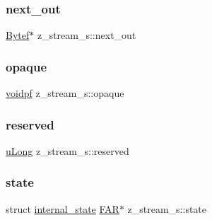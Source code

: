 \subsubsection{\texorpdfstring{next\+\_\+out}{next\_out}}
{\footnotesize\ttfamily \hyperlink{zconf_8h_aeb722a888064be47e12d05f692e0f407}{Bytef}$\ast$ z\+\_\+stream\+\_\+s\+::next\+\_\+out}

\mbox{\label{structz__stream__s_ab72467f908d2ce65d5b42ee6556ef8bb}} 
\subsubsection{\texorpdfstring{opaque}{opaque}}
{\footnotesize\ttfamily \hyperlink{zconf_8h_a04c731495379021454c8e61439dc88ec}{voidpf} z\+\_\+stream\+\_\+s\+::opaque}

\mbox{\label{structz__stream__s_add73791dd19b49c9c68f3f3d328c37db}} 
\subsubsection{\texorpdfstring{reserved}{reserved}}
{\footnotesize\ttfamily \hyperlink{zconf_8h_acd2a5701a3aecf6700d2c66c606ecb40}{u\+Long} z\+\_\+stream\+\_\+s\+::reserved}

\mbox{\label{structz__stream__s_ac4a114217a1868dc6fbe7d1f5bda126b}} 
\subsubsection{\texorpdfstring{state}{state}}
{\footnotesize\ttfamily struct \hyperlink{structinternal__state}{internal\+\_\+state} \hyperlink{zconf_8h_aef060b3456fdcc093a7210a762d5f2ed}{F\+AR}$\ast$ z\+\_\+stream\+\_\+s\+::state}

\mbox{\label{structz__stream__s_aa8f408b9632737dc21519fa1ed34b08d}} 
